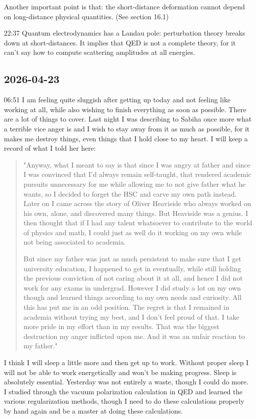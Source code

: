 \documentclass[11pt,a4paper]{article}
\begin{document}
Another important point is that: the short-distance deformation cannot depend on long-distance physical quantities. (See section 16.1)

22:37 Quantum electrodynamics has a Landau pole: perturbation theory breaks down at short-distances. It implies that QED is not a complete theory, for it can't say how to compute scattering amplitudes at all energies. 



\subsection{2026-04-23}
06:51 I am feeling quite sluggish after getting up today and not feeling like working at all, while also wishing to finish everything as soon as possible. There are a lot of things to cover. Last night I was describing to Sabiha once more what a terrible vice anger is and I wish to stay away from it as much as possible, for it makes me destroy things, even things that I hold close to my heart. I will keep a record of what I told her here: 
\begin{quote}
	"Anyway, what I meant to say is that since I was angry at father and since I was convinced that I'd always remain self-taught, that rendered academic pursuits unnecessary for me while allowing me to not give father what he wants, so I decided to forget the HSC and carve my own path instead. Later on I came across the story of Oliver Heaviside who always worked on his own, alone, and discovered many things. But Heaviside was a genius. I then thought that if I had any talent whatsoever to contribute to the world of physics and math, I could just as well do it working on my own while not being associated to academia.

	But since my father was just as much persistent to make sure that I get university education, I happened to get in eventually, while still holding the previous conviction of not caring about it at all, and hence I did not work for any exams in undergrad. However I did study a lot on my own though and learned things according to my own needs and curiosity. All this has put me in an odd position. The regret is that I remained in academia without trying my best, and I don't feel proud of that. I take more pride in my effort than in my results. That was the biggest destruction my anger inflicted upon me. And it was an unfair reaction to my father."
\end{quote}

I think I will sleep a little more and then get up to work. Without proper sleep I will  not be able to work energetically and won't be making progress. Sleep is absolutely essential. Yesterday was not entirely a waste, though I could do more. I studied through the vacuum polarization calculation in QED and learned the various regularization methods, though I need to do these calculations properly by hand again and be a master at doing these calculations.
\end{document}
